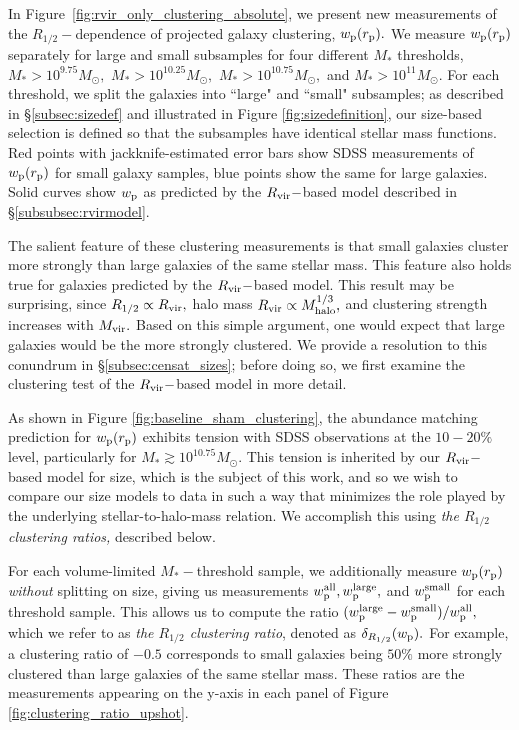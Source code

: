 \documentclass[usenatbib,usegraphicx,letterpaper]{mn2e}
\newcommand{\rhalf}{R_{1/2}}
\newcommand{\mstar}{M_{\ast}}
\newcommand{\mvir}{M_{\rm vir}}
\newcommand{\mhalo}{M_{\rm halo}}
\newcommand{\rvir}{R_{\rm vir}}
\newcommand{\rproj}{r_{\rm p}}
\newcommand{\wproj}{w_{\rm p}}
\newcommand{\wplarge}{w_{\rm p}^{\rm large}}
\newcommand{\wpsmall}{w_{\rm p}^{\rm small}}
\newcommand{\wpall}{w_{\rm p}^{\rm all}}
\newcommand{\msun}{M_\odot}
\begin{document}
In Figure~\ref{fig:rvir_only_clustering_absolute}, we present new measurements of the $\rhalf-$dependence of projected galaxy clustering, $\wproj(\rproj).$ We measure $\wproj(\rproj)$ separately for large and small subsamples for four different $\mstar$ thresholds, $\mstar>10^{9.75}\msun,$ $\mstar>10^{10.25}\msun,$ $\mstar>10^{10.75}\msun,$ and $\mstar>10^{11}\msun.$ For each threshold, we split the galaxies into ``large" and ``small" subsamples; as described in \S\ref{subsec:sizedef} and illustrated in Figure \ref{fig:sizedefinition}, our size-based selection is defined so that the subsamples have identical stellar mass functions. Red points with jackknife-estimated error bars show SDSS measurements of $\wproj(\rproj)$ for small galaxy samples, blue points show the same for large galaxies. Solid curves show $\wproj$ as predicted by the $\rvir-$based model described in \S\ref{subsubsec:rvirmodel}. 

The salient feature of these clustering measurements is that small galaxies cluster more strongly than large galaxies of the same stellar mass. This feature also holds true for galaxies predicted by the $\rvir-$based model. This result may be surprising, since $\rhalf\propto\rvir,$ halo mass $\rvir\propto\mhalo^{1/3},$ and clustering strength increases with $\mvir.$ Based on this simple argument, one would expect that large galaxies would be the more strongly clustered. We provide a resolution to this conundrum in \S\ref{subsec:censat_sizes}; before doing so, we first examine the clustering test of the $\rvir-$based model in more detail.

As shown in Figure \ref{fig:baseline_sham_clustering}, the abundance matching prediction for $\wproj(\rproj)$ exhibits tension with SDSS observations at the $10-20\%$ level, particularly for $\mstar\gtrsim10^{10.75}\msun.$ This tension is inherited by our $\rvir-$based model for size, which is the subject of this work, and so we wish to compare our size models to data in such a way that minimizes the role played by the underlying stellar-to-halo-mass relation. We accomplish this using {\em the $\rhalf$ clustering ratios,} described below. 

For each volume-limited $\mstar-$threshold sample, we additionally measure $\wproj(\rproj)$ {\em without} splitting on size, giving us measurements $\wpall, \wplarge,$ and $\wpsmall$ for each threshold sample. This allows us to compute the ratio $(\wplarge-\wpsmall)/\wpall,$ which we refer to as {\em the $\rhalf$ clustering ratio}, denoted as $\delta_{\rhalf}(\wproj).$ For example, a clustering ratio of $-0.5$ corresponds to small galaxies being $50\%$ more strongly clustered than large galaxies of the same stellar mass. These ratios are the measurements appearing on the y-axis in each panel of Figure \ref{fig:clustering_ratio_upshot}. 
\end{document}
